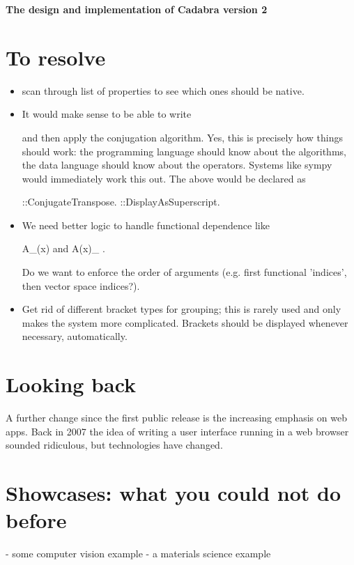 \documentclass[11pt]{article}
\begin{document}
{\bf The design and implementation of Cadabra version 2}

\section{To resolve}

\begin{itemize}
\item scan through list of properties to see which ones should be
native.

\item It would make sense to be able to write


and then apply the conjugation algorithm. Yes, this is precisely how
things should work: the programming language should know about the
algorithms, the data language should know about the operators. Systems
like sympy would immediately work this out. The above would be
declared as

  \dagger{#}::ConjugateTranspose.
  \dagger{#}::DisplayAsSuperscript.

\item We need better logic to handle functional dependence like

   A_\mu(x)  and  A(x)_{\mu} .

Do we want to enforce the order of arguments (e.g. first functional
'indices', then vector space indices?).  

\item Get rid of different bracket types for grouping; this is rarely used and only
makes the system more complicated. Brackets should be displayed
whenever necessary, automatically. 
\end{itemize}


\section{Looking back}


A further change since the first public release is the increasing
emphasis on web apps. Back in 2007 the idea of writing a user
interface running in a web browser sounded ridiculous, but
technologies have changed. 

\section{Showcases: what you could not do before}

- some computer vision example
- a materials science example
\end{document}
